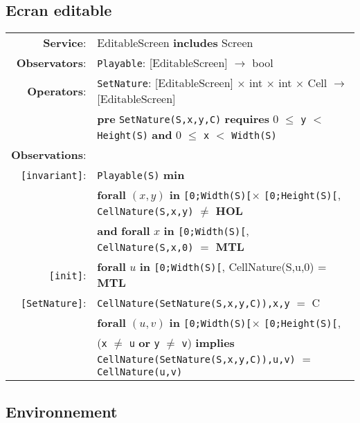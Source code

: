 \documentclass{article}
\begin{document}
\subsection*{Ecran editable}

\begin{tabular}{rl}
\textbf{Service}: & \textrm{EditableScreen} {\bf includes} \textrm{Screen}  \\
\textbf{Observators}: & \texttt{Playable}: \textrm{[EditableScreen]} $\rightarrow$ \textrm{bool} \\
\textbf{Operators}: & \texttt{SetNature}: \textrm{[EditableScreen]} $\times$ \textrm{int} $\times$ \textrm{int} $\times$ \textrm{Cell}  $\rightarrow$ \textrm{[EditableScreen]} \\
& \quad \textbf{pre } \texttt{SetNature(S,x,y,C)} \textbf{ requires } 0 $\leq$ \texttt{y} $<$ \texttt{Height(S)} \textbf{ and } 0 $\leq$ \texttt{x} $<$ \texttt{Width(S)}\\
\textbf{Observations}: \\
\texttt{[invariant]}: & \texttt{Playable(S)} \textbf{min} \\
& \quad\quad\quad\quad \textbf{forall} $(x,y)$ \textbf{in} \texttt{[0;Width(S)[}$\times$ \texttt{[0;Height(S)[}, \texttt{CellNature(S,x,y)} $\neq$ \textbf{HOL}  \\
& \quad\quad\quad\quad \textbf{and} \textbf{forall} $x$ \textbf{in} \texttt{[0;Width(S)[}, \texttt{CellNature(S,x,0)} $=$ \textbf{MTL}  \\

\texttt{[init]}:  & \textbf{forall} $u$ \textbf{in} \texttt{[0;Width(S)[}, CellNature(S,u,0) = \textbf{MTL} \\

\texttt{[SetNature]}: & \texttt{CellNature(SetNature(S,x,y,C)),x,y} $=$ C \\
        & \textbf{forall} $(u,v)$ \textbf{in} \texttt{[0;Width(S)[}$\times$ \texttt{[0;Height(S)[}, \\ & \quad\quad\quad\quad (\texttt{x} $\neq$ \texttt{u} \textbf{or} \texttt{y} $\neq$ \texttt{v}) \textbf{implies} \texttt{CellNature(SetNature(S,x,y,C)),u,v)} $=$ \texttt{CellNature(u,v)} \\
\end{tabular}


\subsection*{Environnement}
\end{document}
